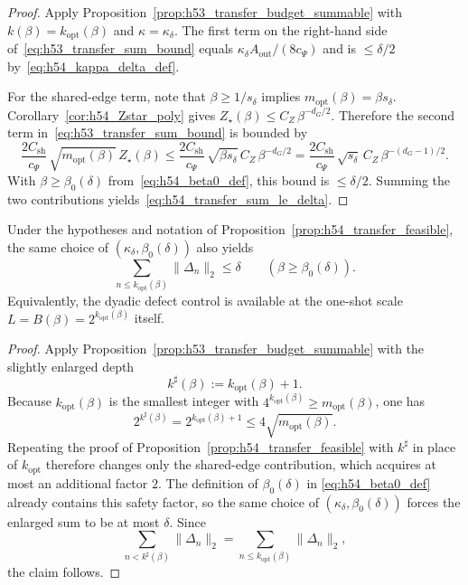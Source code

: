 \begin{proof}
Apply Proposition~\ref{prop:h53_transfer_budget_summable} with $k(\beta)=k_{\mathrm{opt}}(\beta)$ and $\kappa=\kappa_{\delta}$.
The first term on the right-hand side of~\eqref{eq:h53_transfer_sum_bound} equals
$\kappa_{\delta}A_{\mathrm{out}}/(8c_\Psi)$ and is $\le \delta/2$ by~\eqref{eq:h54_kappa_delta_def}.

For the shared-edge term, note that $\beta\ge 1/s_{\delta}$ implies $m_{\mathrm{opt}}(\beta)=\beta s_{\delta}$.
Corollary~\ref{cor:h54_Zstar_poly} gives $Z_\star(\beta)\le C_Z\,\beta^{-d_G/2}$.
Therefore the second term in~\eqref{eq:h53_transfer_sum_bound} is bounded by
\[
\frac{2C_{\mathrm{sh}}}{c_\Psi}\,\sqrt{m_{\mathrm{opt}}(\beta)}\,Z_\star(\beta)
\le
\frac{2C_{\mathrm{sh}}}{c_\Psi}\,\sqrt{\beta s_{\delta}}\,C_Z\,\beta^{-d_G/2}
=
\frac{2C_{\mathrm{sh}}}{c_\Psi}\,\sqrt{s_{\delta}}\,C_Z\,\beta^{-(d_G-1)/2}.
\]
With $\beta\ge \beta_0(\delta)$ from~\eqref{eq:h54_beta0_def}, this bound is $\le \delta/2$.
Summing the two contributions yields~\eqref{eq:h54_transfer_sum_le_delta}.
\end{proof}

\begin{corollary}\label{cor:h54_transfer_sum_one_shot}
Under the hypotheses and notation of Proposition~\ref{prop:h54_transfer_feasible}, the same choice of $(\kappa_\delta,\beta_0(\delta))$ also yields
\[
\sum_{n\le k_{\mathrm{opt}}(\beta)} \|\Delta_n\|_2 \le \delta
\qquad (\beta\ge \beta_0(\delta)).
\]
Equivalently, the dyadic defect control is available at the one-shot scale $L=B(\beta)=2^{k_{\mathrm{opt}}(\beta)}$ itself.
\end{corollary}

\begin{proof}
Apply Proposition~\ref{prop:h53_transfer_budget_summable} with the slightly enlarged depth
\[
 k^{\sharp}(\beta):=k_{\mathrm{opt}}(\beta)+1.
\]
Because $k_{\mathrm{opt}}(\beta)$ is the smallest integer with $4^{k_{\mathrm{opt}}(\beta)}\ge m_{\mathrm{opt}}(\beta)$, one has
\[
2^{k^{\sharp}(\beta)}=2^{k_{\mathrm{opt}}(\beta)+1}\le 4\sqrt{m_{\mathrm{opt}}(\beta)}.
\]
Repeating the proof of Proposition~\ref{prop:h54_transfer_feasible} with $k^{\sharp}$ in place of $k_{\mathrm{opt}}$ therefore changes only the shared-edge contribution, which acquires at most an additional factor $2$.
The definition of $\beta_0(\delta)$ in \eqref{eq:h54_beta0_def} already contains this safety factor, so the same choice of $(\kappa_\delta,\beta_0(\delta))$ forces the enlarged sum to be at most $\delta$.
Since
\[
\sum_{n<k^{\sharp}(\beta)}\|\Delta_n\|_2
=
\sum_{n\le k_{\mathrm{opt}}(\beta)}\|\Delta_n\|_2,
\]
the claim follows.
\end{proof}


